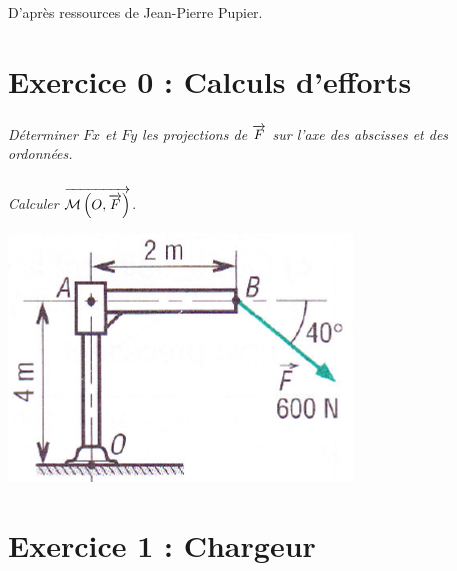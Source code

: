 \documentclass[10pt]{article}
\newif\ifxp
\begin{document}
\ifxp

\else

\fi



\begin{flushright}
D'après ressources de Jean-Pierre Pupier.
\end{flushright}

\section*{Exercice 0 : Calculs d'efforts}


\begin{minipage}[c]{.68\linewidth}
\subparagraph{} \textit{Déterminer $Fx$ et $Fy$ les projections de $\overrightarrow{F}$ sur l'axe des abscisses et des ordonnées.}

\subparagraph{} \textit{Calculer $\overrightarrow{\mathcal{M}\left(O,\overrightarrow{F} \right)}$}.
\end{minipage} \hfill
\begin{minipage}[c]{.3\linewidth}
\begin{center}
\includegraphics[width=.95\textwidth]{images/fig0}
\end{center}
\end{minipage}



\setcounter{subparagraph}{0}

\section*{Exercice 1 : Chargeur}
\end{document}
